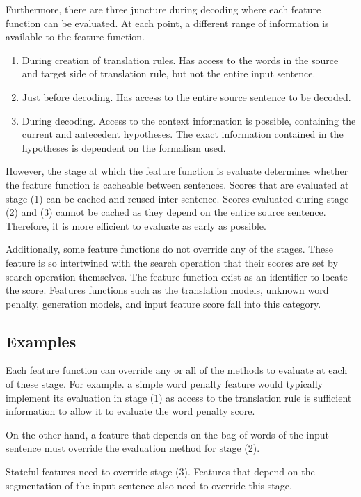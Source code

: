 \documentclass{pbml}
\begin{document}
Furthermore, there are three juncture during decoding where each feature function can be evaluated. At each point, a different range of information is available to the feature function. 
\begin{enumerate}
    \item During creation of translation rules. Has access to the words in the source and target side of translation rule, but not the entire input sentence.
    \item Just before decoding. Has access to the entire source sentence to be decoded.
    \item During decoding. Access to the context information is possible, containing the current and antecedent hypotheses. The exact information contained in the hypotheses is dependent on the formalism used.
\end{enumerate}
However, the stage at which the feature function is evaluate determines whether the feature function is cacheable between sentences. Scores that are evaluated at stage (1) can be cached and reused inter-sentence. Scores evaluated during stage (2) and (3) cannot be cached as they depend on the entire source sentence. Therefore, it is more efficient to evaluate as early as possible.

Additionally, some feature functions do not override any of the stages. These feature is so intertwined with the search operation that their scores are set by search operation themselves. The feature function exist as an identifier to locate the score. Features functions such as the translation models, unknown word penalty,  generation models, and input feature score fall into this category.

\subsection{Examples}

Each feature function can override any or all of the methods to evaluate at each of these stage. For example. a simple word penalty feature would typically implement its evaluation in stage (1) as access to the translation rule is sufficient information to allow it to evaluate the word penalty score.

On the other hand, a feature that depends on the bag of words of the input sentence must override the evaluation method for stage (2).

Stateful features need to override stage (3). Features that depend on the segmentation of the input sentence also need to override this stage. 
\end{document}

